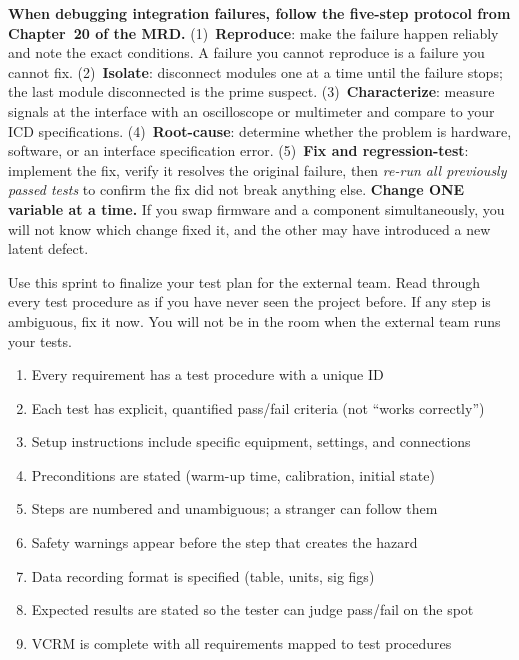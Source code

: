 \begin{protip}
\textbf{When debugging integration failures, follow the five-step protocol from Chapter~20 of the MRD.} (1)~\textbf{Reproduce}: make the failure happen reliably and note the exact conditions. A failure you cannot reproduce is a failure you cannot fix. (2)~\textbf{Isolate}: disconnect modules one at a time until the failure stops; the last module disconnected is the prime suspect. (3)~\textbf{Characterize}: measure signals at the interface with an oscilloscope or multimeter and compare to your ICD specifications. (4)~\textbf{Root-cause}: determine whether the problem is hardware, software, or an interface specification error. (5)~\textbf{Fix and regression-test}: implement the fix, verify it resolves the original failure, then \textit{re-run all previously passed tests} to confirm the fix did not break anything else. \textbf{Change ONE variable at a time.} If you swap firmware and a component simultaneously, you will not know which change fixed it, and the other may have introduced a new latent defect.
\end{protip}

\begin{tipbox}
Use this sprint to finalize your test plan for the external team. Read through every test procedure as if you have never seen the project before. If any step is ambiguous, fix it now. You will not be in the room when the external team runs your tests.
\end{tipbox}

\begin{checklistbox}
\begin{enumerate}[leftmargin=*, itemsep=1pt, topsep=0pt]
    \item Every requirement has a test procedure with a unique ID
    \item Each test has explicit, quantified pass/fail criteria (not ``works correctly'')
    \item Setup instructions include specific equipment, settings, and connections
    \item Preconditions are stated (warm-up time, calibration, initial state)
    \item Steps are numbered and unambiguous; a stranger can follow them
    \item Safety warnings appear before the step that creates the hazard
    \item Data recording format is specified (table, units, sig figs)
    \item Expected results are stated so the tester can judge pass/fail on the spot
    \item VCRM is complete with all requirements mapped to test procedures
\end{enumerate}
\end{checklistbox}

